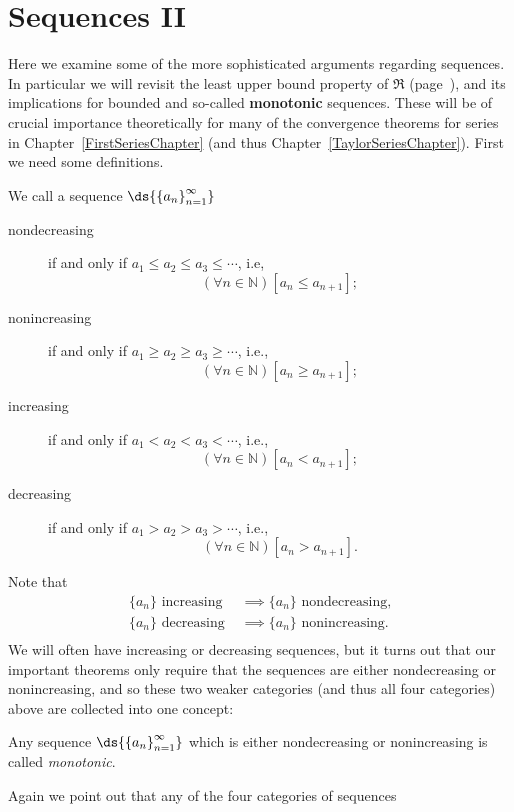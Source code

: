 \newpage
\section{Sequences II}
Here we examine some of the more sophisticated arguments 
regarding sequences.  In particular we will revisit
the least upper bound property of $\Re$
(page~\pageref{LUBPropDefinition}), and its 
implications for bounded and so-called {\bf monotonic}
sequences.  These will be of crucial importance theoretically
for many of the convergence theorems for series in
Chapter~\ref{FirstSeriesChapter} (and thus
Chapter~\ref{TaylorSeriesChapter}).  First we need some
definitions.

\begin{definition}
We call a sequence $\ds{\left\{a_n\right\}_{n=1}^\infty}$
  \begin{description}
  \item[\qquad nondecreasing] 
      if and only if $a_1\le a_2\le a_3\le\cdots$, i.e,
   $$(\forall n\in\mathbb{N})\left[ a_{n}\le a_{n+1}\right];$$
  \item[\qquad nonincreasing]
      if and only if $a_1\ge a_2\ge a_3\ge\cdots$, i.e.,
   $$(\forall n\in\mathbb{N})\left[ a_{n}\ge a_{n+1}\right];$$
  \item[\qquad increasing] if and only if $a_1<a_2<a_3<\cdots$, i.e.,
   $$(\forall n\in\mathbb{N})\left[a_n<a_{n+1}\right];$$
  \item[\qquad decreasing] if and only if $a_1>a_2>a_3>\cdots$, i.e.,
   $$(\forall n\in\mathbb{N})\left[a_n>a_{n+1}\right].$$
  \end{description}
\end{definition}
Note that 
\begin{align*}
   \{a_n\}\text{ increasing }&\implies \{a_n\}\text{ nondecreasing,}\\
   \{a_n\}\text{ decreasing }&\implies \{a_n\}\text{ nonincreasing.}\\
\end{align*}
We will often have increasing or decreasing sequences, but it turns
out that our important theorems only require that the sequences
are either nondecreasing or nonincreasing, and so these two 
weaker categories (and thus all four categories) above are
collected into one concept:
\begin{definition}
Any sequence $\ds{\left\{a_n\right\}_{n=1}^\infty}$ which
is either nondecreasing or nonincreasing is called
{\it monotonic}.\end{definition}
Again we point out that any of the four categories of sequences
